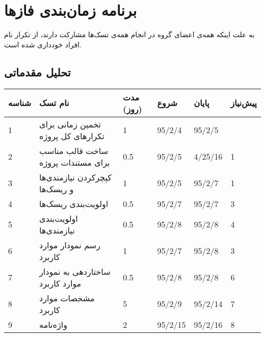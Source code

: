 
\chapter{برنامه زمان‌بندی فازها}
به علت اینکه همه‌ی اعضای گروه در انجام همه‌ی تسک‌ها مشارکت دارند، از تکرار نام افراد خودداری شده است.

\section{تحلیل مقدماتی}
\begin{tabular}[H]{ | l | l | l | l | l | l | }
	\hline
	شناسه & نام تسک & مدت (روز) & شروع & پایان & پیش‌نیاز    \\ \hline
	1 & تخمین زمانی برای تکرارهای کل پروژه & 1   &   95/2/4 &   95/2/5 &     \\ \hline
	2 & ساخت قالب مناسب برای مستندات پروژه & 0.5   &   95/2/5 &   4/25/16 & 1    \\ \hline
	3 & کپچرکردن نیازمندی‌ها و ریسک‌ها & 1   &   95/2/5 &   95/2/7 & 1    \\ \hline
	4 & اولویت‌بندی ریسک‌ها & 0.5   &   95/2/7 &   95/2/7 & 3    \\ \hline
	5 & اولویت‌بندی نیازمندی‌ها & 0.5   &   95/2/8 &   95/2/8 & 4    \\ \hline
	6 & رسم نمودار موارد کاربرد & 1   &   95/2/7 &   95/2/8 & 3    \\ \hline
	7 & ساختاردهی به نمودار موارد کاربرد & 0.5   &   95/2/8 &   95/2/8 & 6    \\ \hline
	8 & مشخصات موارد کاربرد & 5   &   95/2/9 &   95/2/14 & 7    \\ \hline
	9 & واژه‌نامه & 2   &   95/2/15 &   95/2/16 & 8    \\ \hline
\end{tabular}

